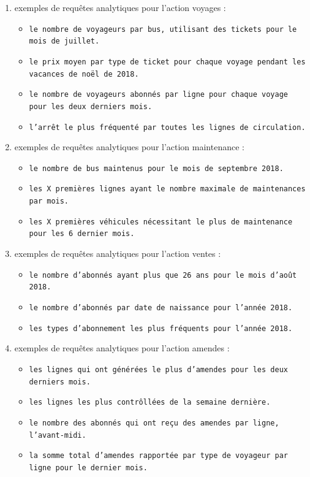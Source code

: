 \documentclass[a4paper,12pt]{report}
\begin{document}
\begin{enumerate}
  \item exemples de requêtes analytiques pour l'action \og voyages \fg :
  \begin{itemize}
    \item \texttt{le nombre de voyageurs par bus, utilisant des tickets pour le mois de juillet.}
    \item \texttt{le prix moyen par type de ticket pour chaque voyage pendant les vacances de noël de 2018.}
    \item \texttt{le nombre de voyageurs abonnés par ligne pour chaque voyage pour les deux derniers mois.}
    \item \texttt{l'arrêt le plus fréquenté par toutes les lignes de circulation.}
  \end{itemize}
  \item exemples de requêtes analytiques pour l'action \og maintenance \fg :
  \begin{itemize}
    \item \texttt{le nombre de bus maintenus pour le mois de septembre 2018.}
    \item \texttt{les X premières lignes ayant le nombre maximale de maintenances par mois.}
    \item \texttt{les X premières véhicules nécessitant le plus de maintenance pour les 6 dernier mois.}
  \end{itemize}
  \item exemples de requêtes analytiques pour l'action \og ventes \fg :
  \begin{itemize}
    \item \texttt{le nombre d'abonnés ayant plus que 26 ans pour le mois d'août 2018.}
    \item \texttt{le nombre d'abonnés par date de naissance pour l'année 2018.}
    \item \texttt{les types d'abonnement les plus fréquents pour l'année 2018.}
  \end{itemize}
  \item exemples de requêtes analytiques pour l'action \og amendes \fg :
  \begin{itemize}
    \item \texttt{les lignes qui ont générées le plus d'amendes pour les deux derniers mois.}
    \item \texttt{les lignes les plus contrôllées de la semaine dernière.}
    \item \texttt{le nombre des abonnés qui ont reçu des amendes par ligne, l'avant-midi.}
    \item \texttt{la somme total d'amendes rapportée par type de voyageur par ligne pour le dernier mois.}
  \end{itemize}
\end{enumerate}
\end{document}

